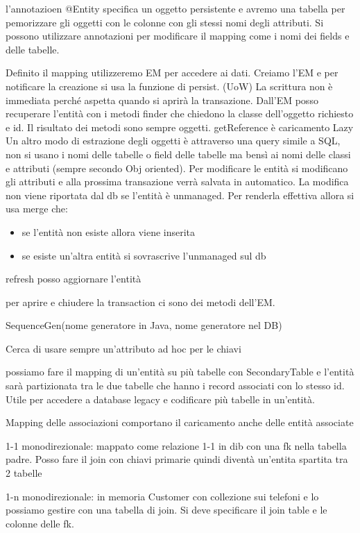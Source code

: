 l'annotazioen @Entity specifica un oggetto persistente e avremo una tabella 
per pemorizzare gli oggetti con le colonne con gli stessi nomi degli attributi.
Si possono utilizzare annotazioni per modificare il mapping come i nomi dei fields 
e delle tabelle. 

Definito il mapping utilizzeremo EM per accedere ai dati. Creiamo l'EM e per 
notificare la creazione si usa la funzione di persist. (UoW) La scrittura non è 
immediata perché aspetta quando si aprirà la transazione. Dall'EM posso recuperare
l'entità con i metodi finder che chiedono la classe dell'oggetto richiesto e id.
Il risultato dei metodi sono sempre oggetti.
getReference è caricamento Lazy
Un altro modo di estrazione degli oggetti è attraverso una query simile a SQL,
non si usano i nomi delle tabelle o field delle tabelle ma bensì ai nomi delle classi
e attributi (sempre secondo Obj oriented).
Per modificare le entità si modificano gli attributi e alla prossima transazione
verrà salvata in automatico. La modifica non viene riportata dal db se l'entità
è unmanaged. Per renderla effettiva allora si usa merge che:
\begin{itemize}
      \item se l'entità non esiste allora viene inserita
      \item se esiste un'altra entità si sovrascrive l'unmanaged sul db
\end{itemize}

refresh posso aggiornare l'entità 

per aprire e chiudere la transaction ci sono dei metodi dell'EM. 


SequenceGen(nome generatore in Java, nome generatore nel DB)

Cerca di usare sempre un'attributo ad hoc per le chiavi

possiamo fare il mapping di un'entità su più tabelle con SecondaryTable e l'entità
sarà partizionata tra le due tabelle che hanno i record associati con lo stesso id.
Utile per accedere a database legacy e codificare più tabelle in un'entità.

Mapping delle associazioni comportano il caricamento anche delle entità associate

1-1 monodirezionale: mappato come relazione 1-1 in dib con una fk nella tabella 
padre. Posso fare il join con chiavi primarie quindi diventà un'entita spartita 
tra 2 tabelle

1-n monodirezionale: in memoria Customer con collezione sui telefoni e lo possiamo
gestire con una tabella di join. Si deve specificare il join table e le colonne 
delle fk.

